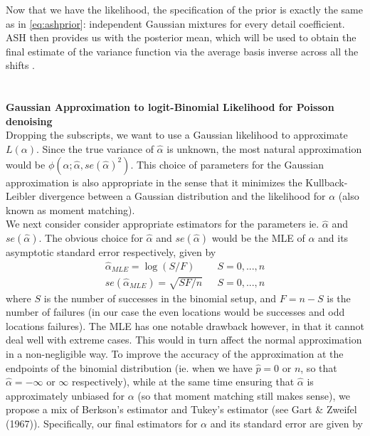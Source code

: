 \documentclass[12pt]{article}
\newcommand{\Ga}{\alpha}
\begin{document}
\begin{appendices}
Now that we have the likelihood, the specification of the prior is exactly the same as in \eqref{eq:ashprior}: independent Gaussian mixtures for every detail coefficient. ASH then provides us with the posterior mean, which will be used to obtain the final estimate of the variance function via the average basis inverse across all the shifts .\bigskip\\
\section{}\label{app:likelihood approx}\bigskip
\textbf{Gaussian Approximation to logit-Binomial Likelihood for Poisson denoising}\bigskip\\
Dropping the subscripts, we want to use a Gaussian likelihood to approximate $L(\Ga)$. Since the true variance of $\hat{\Ga}$ is unknown, the most natural approximation would be $\phi(\Ga;\hat{\Ga},se(\hat{\Ga})^2)$. This choice of parameters for the Gaussian approximation is also appropriate in the sense that it minimizes the Kullback-Leibler divergence between a Gaussian distribution and the likelihood for $\Ga$ (also known as moment matching).\bigskip\\
We next consider consider appropriate estimators for the parameters ie. $\hat{\Ga}$ and $se(\hat{\Ga})$. The obvious choice for $\hat{\Ga}$ and $se(\hat{\Ga})$ would be the MLE of $\Ga$ and its asymptotic standard error respectively, given by 
\begin{eqnarray}
\hat{\Ga}_{MLE}=\log(S/F)&\ \ \ S=0,...,n\\
se(\hat{\Ga}_{MLE})=\sqrt{SF/n}&\ \ \ S=0,...,n
\end{eqnarray}
where $S$ is the number of successes in the binomial setup, and $F=n-S$ is the number of failures (in our case the even locations would be successes and odd locations failures). The MLE has one notable drawback however, in that it cannot deal well with extreme cases. This would in turn affect the normal approximation in a non-negligible way. To improve the accuracy of the approximation at the endpoints of the binomial distribution (ie. when we have $\hat{p}=0$ or $n$, so that $\hat{\Ga}=-\infty$ or $\infty$ respectively), while at the same time ensuring that $\hat{\Ga}$ is approximately unbiased for $\Ga$ (so that moment matching still makes sense), we propose a mix of Berkson's estimator and Tukey's estimator (see Gart \& Zweifel (1967)). Specifically, our final estimators for $\Ga$ and its standard error are given by
\begin{eqnarray}\label{eq:pseudoMLE1}

\end{eqnarray}
\end{appendices}
\end{document}
